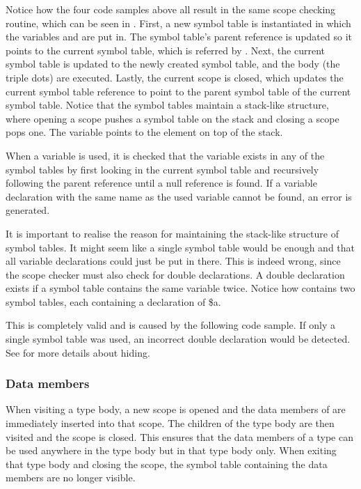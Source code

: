 Notice how the four code samples above all result in the same
scope checking routine, which can be seen in . First, a new
symbol table is instantiated in which the variables  and  are put in. The
symbol table's parent reference is updated so it points to the current symbol
table, which is referred by  . Next, the
current symbol table is updated to the newly created symbol table, and the body
(the triple dots) are executed. Lastly, the current scope is closed, which
updates the current symbol table reference to point to the parent symbol table
of the current symbol table.  Notice that the symbol tables maintain a
stack-like structure, where opening a scope pushes a symbol table on the stack
and closing a scope pops one. The variable 
 points to the element on top of the stack.

When a variable is used, it is checked that the variable exists in any of the
symbol tables by first looking in the current symbol table and recursively
following the parent reference until a null reference is found. If a variable
declaration with the same name as the used variable cannot be found, an error is
generated.


It is important to realise the reason for maintaining the stack-like structure
of symbol tables. It might seem like a single symbol table would be enough and
that all variable declarations could just be put in there. This is indeed wrong,
since the scope checker must also check for double declarations. A double
declaration exists if a symbol table contains the same variable twice. Notice
how  contains two symbol tables, each containing a
declaration of \$a. 


This is completely valid and is caused by the following code sample. If
only a single symbol table was used, an incorrect double declaration
would be detected. See  for more details
about hiding.


\subsubsection{Data members}
When visiting a type body, a new scope is opened and the data members of
  are immediately inserted into that
scope. The children of the type body are then visited and the scope is closed.
This ensures that the data members of a type can be used anywhere in the type
body but in that type body only. When exiting that type body and closing the
scope, the symbol table containing the data members are no longer visible.

